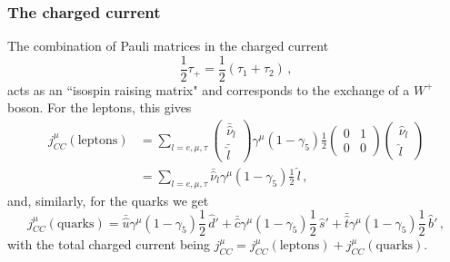   \subsubsection{The charged current}
  The combination of Pauli matrices in the charged current
  \begin{equation}
      \frac{1}{2}\tau_+ = \frac{1}{2}(\tau_1 + \tau_2) \,,
  \end{equation}
  acts as an ``isospin raising matrix" and corresponds to the exchange of a
  $W^+$ boson.
  For the leptons, this gives
  \begin{equation}
    \begin{aligned}
      j^{\mu}_{CC}(\textrm{leptons}) &= \sum_{l=e,\mu,\tau}
      \begin{pmatrix}
          \bar{\hat{\nu}}_l \\
          \bar{\hat{l}}
      \end{pmatrix}
      \gamma^{\mu}(1-\gamma_5)\frac{1}{2}
      \begin{pmatrix}
        0 & 1 \\
        0 & 0
      \end{pmatrix}
      \begin{pmatrix}
        \hat{\nu}_l \\
          \hat{l}
      \end{pmatrix} \\
      &= \sum_{l=e,\mu,\tau} \bar{\hat{\nu}}_{l} \gamma^{\mu}(1-\gamma_5)\frac{1}{2}\, \hat{l} \,,
    \end{aligned}
  \end{equation}
  and, similarly, for the quarks we get
  \begin{equation}
      j^{\mu}_{CC}(\textrm{quarks}) =
       \bar{\hat{u}}\gamma^{\mu}(1-\gamma_5)\frac{1}{2}\,\hat{d}'
       +\bar{\hat{c}}\gamma^{\mu}(1-\gamma_5)\frac{1}{2}\,\hat{s}'
       +\bar{\hat{t}}\gamma^{\mu}(1-\gamma_5)\frac{1}{2}\,\hat{b}' \,,
  \end{equation}
  with the total charged current being $j^{\mu}_{CC} =
  j^{\mu}_{CC}(\textrm{leptons}) + j^{\mu}_{CC}(\textrm{quarks})$.

